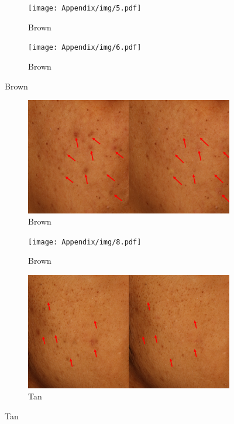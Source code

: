 \begin{appendices}
\begin{spacing}{1.5}
\begin{figure}[h]
    \begin{subfigure}{.5\textwidth}
        \centering
        \texttt{[image: Appendix/img/5.pdf]}
        \caption{Brown}
      \end{subfigure}%
      \begin{subfigure}{.5\textwidth}
        \centering
        \texttt{[image: Appendix/img/6.pdf]}
        \caption{Brown}
      \end{subfigure}
\end{figure}
\begin{figure}[p]\ContinuedFloat
    \begin{subfigure}{.5\textwidth}
        \centering
        \includegraphics[width=.9\linewidth]{Appendix/img/7.pdf}
        \caption{Brown}
      \end{subfigure}%
      \begin{subfigure}{.5\textwidth}
        \centering
        \texttt{[image: Appendix/img/8.pdf]}
        \caption{Brown}
      \end{subfigure}
    \begin{subfigure}{.5\textwidth}
        \centering
        \includegraphics[width=.9\linewidth]{Appendix/img/9.pdf}
        \caption{Tan}
      \end{subfigure}%

\end{figure}
\end{spacing}
\end{appendices}
